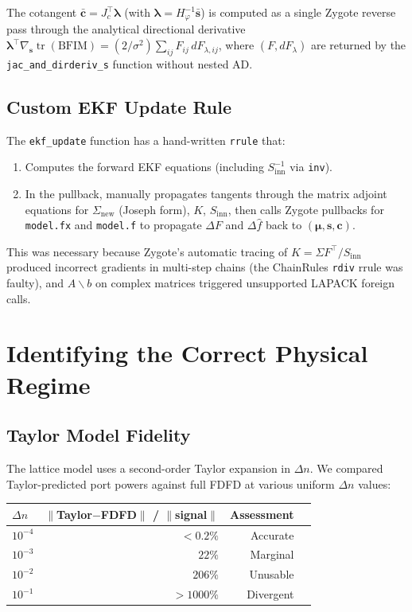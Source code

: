 \documentclass[11pt,a4paper]{article}
\newcommand{\tr}{\operatorname{tr}}
\begin{document}
The cotangent $\bar{\bm{c}} = J_c^\top \bm{\lambda}$ (with $\bm{\lambda} = H_\varphi^{-1} \bar{\bm{s}}$) is computed as a single Zygote reverse pass through the analytical directional derivative $\bm{\lambda}^\top \nabla_{\bm{s}} \tr(\text{BFIM}) = (2/\sigma^2) \sum_{ij} F_{ij} \, dF_{\lambda,ij}$, where $(F, dF_\lambda)$ are returned by the \texttt{jac\_and\_dirderiv\_s} function without nested AD.

\subsection{Custom EKF Update Rule}

The \texttt{ekf\_update} function has a hand-written \texttt{rrule} that:
\begin{enumerate}[nosep]
  \item Computes the forward EKF equations (including $S_{\text{inn}}^{-1}$ via \texttt{inv}).
  \item In the pullback, manually propagates tangents through the matrix adjoint equations for $\Sigma_{\text{new}}$ (Joseph form), $K$, $S_{\text{inn}}$, then calls Zygote pullbacks for \texttt{model.fx} and \texttt{model.f} to propagate $\Delta F$ and $\Delta\hat{f}$ back to $(\bm{\mu}, \bm{s}, \bm{c})$.
\end{enumerate}

This was necessary because Zygote's automatic tracing of $K = \Sigma F^\top / S_{\text{inn}}$ produced incorrect gradients in multi-step chains (the ChainRules \texttt{rdiv} rrule was faulty), and $A \backslash b$ on complex matrices triggered unsupported LAPACK foreign calls.

\section{Identifying the Correct Physical Regime}

\subsection{Taylor Model Fidelity}

The lattice model uses a second-order Taylor expansion in $\Delta n$.  We compared Taylor-predicted port powers against full FDFD at various uniform $\Delta n$ values:

\begin{center}
\begin{tabular}{@{}lrrr@{}}
\toprule
$\Delta n$ & $\|$Taylor$-$FDFD$\|$ / $\|$signal$\|$ & Assessment \\
\midrule
$10^{-4}$ & $< 0.2\%$ & Accurate \\
$10^{-3}$ & $22\%$ & Marginal \\
$10^{-2}$ & $206\%$ & Unusable \\
$10^{-1}$ & $>1000\%$ & Divergent \\
\bottomrule
\end{tabular}
\end{center}
\end{document}
